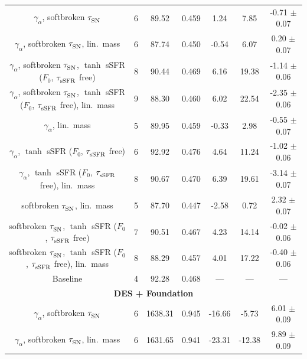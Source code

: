 \begin{longtable}{c c c c c c c}
    $\gamma_\alpha^{}$, softbroken $\tau_{\rm SN}^{}$ & 6 & 89.52 & 0.459 & 1.24 & \cellcolor{aiclightred}7.85 & -0.71 $\pm$ 0.07 \\
    $\gamma_\alpha^{}$, softbroken $\tau_{\rm SN}^{}$, lin.\ mass & 6 & 87.74 & 0.450 & -0.54 & \cellcolor{aiclightred}6.07 & 0.20 $\pm$ 0.07 \\
    $\gamma_\alpha^{}$, softbroken $\tau_{\rm SN}^{}$, $\tanh$ sSFR ($F_0$, $\tau_{\rm sSFR}^{}$ free) & 8 & 90.44 & 0.469 & \cellcolor{aicorange}6.16 & \cellcolor{aicred}19.38 & \cellcolor{aicorange}-1.14 $\pm$ 0.06 \\
    $\gamma_\alpha^{}$, softbroken $\tau_{\rm SN}^{}$, $\tanh$ sSFR ($F_0$, $\tau_{\rm sSFR}^{}$ free), lin.\ mass & 9 & 88.30 & 0.460 & \cellcolor{aicorange}6.02 & \cellcolor{aicred}22.54 & \cellcolor{aicorange}-2.35 $\pm$ 0.06 \\
    $\gamma_\alpha^{}$, lin.\ mass & 5 & 89.95 & 0.459 & -0.33 & \cellcolor{aiclightorange}2.98 & -0.55 $\pm$ 0.07 \\
    $\gamma_\alpha^{}$, $\tanh$ sSFR ($F_0$, $\tau_{\rm sSFR}^{}$ free) & 6 & 92.92 & 0.476 & \cellcolor{aicorange}4.64 & \cellcolor{aicred}11.24 & \cellcolor{aicorange}-1.02 $\pm$ 0.06 \\
    $\gamma_\alpha^{}$, $\tanh$ sSFR ($F_0$, $\tau_{\rm sSFR}^{}$ free), lin.\ mass & 8 & 90.67 & 0.470 & \cellcolor{aicorange}6.39 & \cellcolor{aicred}19.61 & \cellcolor{aiclightred}-3.14 $\pm$ 0.07 \\
    softbroken $\tau_{\rm SN}^{}$, lin.\ mass & 5 & 87.70 & 0.447 & \cellcolor{aiclightyellow}-2.58 & 0.72 & \cellcolor{aicyellow}2.32 $\pm$ 0.07 \\
    softbroken $\tau_{\rm SN}^{}$, $\tanh$ sSFR ($F_0$, $\tau_{\rm sSFR}^{}$ free) & 7 & 90.51 & 0.467 & \cellcolor{aicorange}4.23 & \cellcolor{aicred}14.14 & -0.02 $\pm$ 0.06 \\
    softbroken $\tau_{\rm SN}^{}$, $\tanh$ sSFR ($F_0$, $\tau_{\rm sSFR}^{}$ free), lin.\ mass & 8 & 88.29 & 0.457 & \cellcolor{aicorange}4.01 & \cellcolor{aicred}17.22 & -0.40 $\pm$ 0.06 \\
    Baseline & 4 & 92.28 & 0.468 & --- & --- & --- \\
    \hline
    \multicolumn{7}{c}{\textbf{DES + Foundation}} \\
    \hline
    $\gamma_\alpha^{}$, softbroken $\tau_{\rm SN}^{}$ & 6 & 1638.31 & 0.945 & \cellcolor{aicgreen}-16.66 & \cellcolor{aicyellow}-5.73 & \cellcolor{aicgreen}6.01 $\pm$ 0.09 \\
    $\gamma_\alpha^{}$, softbroken $\tau_{\rm SN}^{}$, lin.\ mass & 6 & 1631.65 & 0.941 & \cellcolor{aicgreen}-23.31 & \cellcolor{aicgreen}-12.38 & \cellcolor{aicgreen}9.89 $\pm$ 0.09 \\

\end{longtable}
